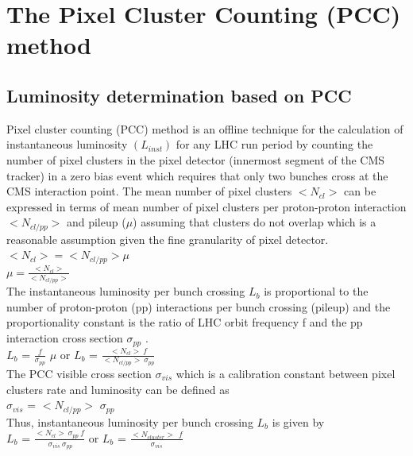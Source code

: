 \section{The Pixel Cluster Counting (PCC) method}
\label{sec:pcc}

\subsection{Luminosity determination based on PCC}
Pixel cluster counting (PCC)  method is an offline technique for the calculation of instantaneous luminosity $(L_{inst})$ for any LHC run period by counting the number of pixel clusters in the pixel detector (innermost segment of the CMS tracker) in a zero bias event which requires that only two bunches cross at the CMS interaction point. The mean number of pixel clusters $<N_{cl}>$ can be expressed in terms of mean number of pixel clusters per proton-proton interaction  $<N_{cl/pp}>$ and pileup ($\mu$) assuming that clusters do not overlap which is a reasonable assumption given the fine granularity of pixel detector. \\


  
$<N_{cl}> = <N_{cl/pp}> \mu$ \\

$\mu = \frac{<N_{cl}>}{<N_{cl/pp}>}$ \\



The instantaneous luminosity per bunch crossing $L_{b}$ is proportional to the number of proton-proton (pp) interactions per bunch crossing (pileup) and the proportionality constant is the ratio of  LHC orbit frequency f and the pp interaction cross section $\sigma_{pp}$ \cite{CMS-PAS-LUM-12-001}. \\

$L_{b}$ = $\frac{f}{\sigma_{pp}}$ $\mu$  or $L_{b}$ = $\frac{<N_{cl}> \: f }{<N_{cl/pp}> \: \sigma_{pp}}$ \\

The PCC visible cross section $\sigma_{vis}$ which is a calibration constant between pixel clusters rate and luminosity can be defined as \\

$\sigma_{vis}$ = $<N_{cl/pp}>$  $\sigma_{pp}$ \\

Thus, instantaneous luminosity per bunch crossing $L_b$ is given by \\

$L_{b}$ = $\frac{<N_{cl}> \: \sigma_{pp} \: f }{ \:\sigma_{vis} \: \sigma_{pp}}$ or $L_{b}$ = $\frac{<N_{cluster}> \:\: f}{\sigma_{vis}}$ \\

